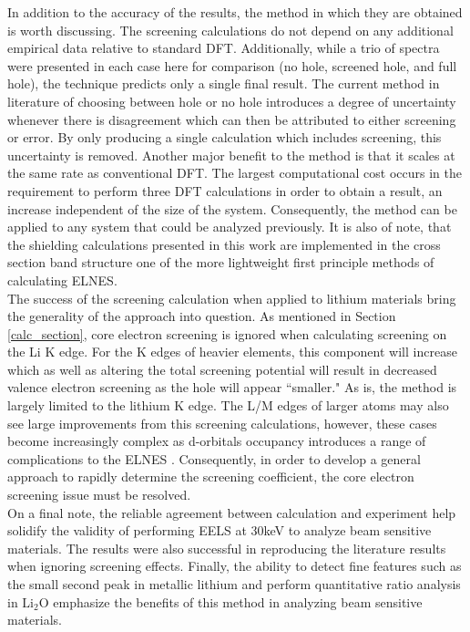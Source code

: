 In addition to the accuracy of the results, the method in which they are obtained is worth discussing. The screening calculations do not depend on any additional empirical data relative to standard DFT.  Additionally, while a trio of spectra were presented in each case here for comparison (no hole, screened hole, and full hole), the technique predicts only a single final result.  The current method in literature of choosing between hole or no hole introduces a degree of uncertainty whenever there is disagreement which can then be attributed to either screening or error. By only producing a single calculation which includes screening, this uncertainty is removed.  Another major benefit to the method is that it scales at the same rate as conventional DFT.  The largest computational cost occurs in the requirement to perform three DFT calculations in order to obtain a result, an increase independent of the size of the system.  Consequently, the method can be applied to any system that could be analyzed previously.  It is also of note, that the shielding calculations presented in this work are implemented in the cross section band structure one of the more lightweight first principle methods of calculating ELNES.\\

The success of the screening calculation when applied to lithium materials bring the generality of the approach into question.  As mentioned in Section \ref{calc_section}, core electron screening is ignored when calculating screening on the Li K edge.  For the K edges of heavier elements, this component will increase which as well as altering the total screening potential will result in decreased valence electron screening as the hole will appear ``smaller."  As is, the method is largely limited to the lithium K edge.  The L/M edges of larger atoms may also see large improvements from this screening calculations, however, these cases become increasingly complex as d-orbitals occupancy introduces a range of complications to the ELNES \cite{hubbard_electron_1963}. Consequently, in order to develop a general approach to rapidly determine the screening coefficient, the core electron screening issue must be resolved.  \\


On a  final note, the reliable agreement between calculation and experiment help solidify the validity of performing EELS at 30keV to analyze beam sensitive materials.  The results were also successful in reproducing the literature results when ignoring screening effects.  Finally, the ability to detect fine features such as the small second peak in metallic lithium and perform quantitative ratio analysis in $ \mathrm{Li_2O} $ emphasize the benefits of this method in analyzing beam sensitive materials.  \\







